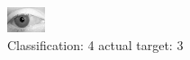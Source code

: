 \begin{figure}[h!]
\begin{center}
\includegraphics[width=0.60\columnwidth]{figures/ID2822_class_4_target_3.png}
\end{center}
\caption{ Classification: 4 actual target: 3}
\label{fig:ID2822_class_4_target_3}
\end{figure}
